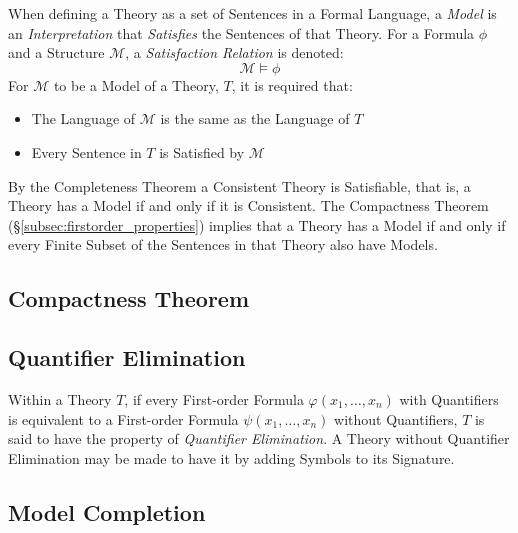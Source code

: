 \documentclass{article}
\begin{document}
When defining a Theory as a set of Sentences in a Formal Language, a
\emph{Model} is an \emph{Interpretation} that \emph{Satisfies} the
Sentences of that Theory. For a Formula $\phi$ and a Structure
$\mathcal{M}$, a \emph{Satisfaction Relation} is denoted:
\[
    \mathcal{M} \vDash \phi
\]
For $\mathcal{M}$ to be a Model of a Theory, $T$, it is required that:
\begin{itemize}
\item The Language of $\mathcal{M}$ is the same as the Language of $T$
\item Every Sentence in $T$ is Satisfied by $\mathcal{M}$
\end{itemize}
By the Completeness Theorem a Consistent Theory is Satisfiable, that
is, a Theory has a Model if and only if it is Consistent. The
Compactness Theorem (\S\ref{subsec:firstorder_properties}) implies
that a Theory has a Model if and only if every Finite Subset of the
Sentences in that Theory also have Models.



\subsection{Compactness Theorem}


\subsection{Quantifier Elimination}

Within a Theory $T$, if every First-order Formula $\varphi(x_1,
\ldots, x_n)$ with Quantifiers is equivalent to a First-order Formula
$\psi(x_1, \ldots, x_n)$ without Quantifiers, $T$ is said to have the
property of \emph{Quantifier Elimination}. A Theory without Quantifier
Elimination may be made to have it by adding Symbols to its Signature.

\subsection{Model Completion}\label{subsec:model_completion}
\end{document}
